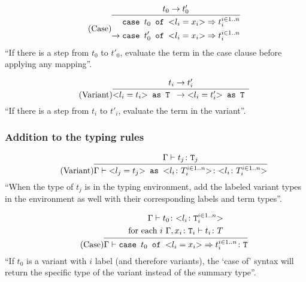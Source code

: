 \begin{equation*}
    \tag{Case}
    \infer{
        \begin{split}
            \texttt{case } t_0 \texttt{ of } \text{<}l_i=x_i\text{>} \Rightarrow t_i^{i \in 1..n} \\
            \rightarrow \texttt{case } t'_0 \texttt{ of } \text{<}l_i=x_i\text{>} \Rightarrow t_i^{i \in 1..n}
        \end{split}
    }{
        t_0 \rightarrow t'_0
    }
\end{equation*}
``If there is a step from $t_0$ to $t'_0$, evaluate the term
in the case clause before applying any mapping''.

\begin{equation*}
    \tag{Variant}
    \infer{
        \text{<}l_i=t_i\text{>} \texttt{ as T } \rightarrow \text{<}l_i=t'_i\text{>} \texttt{ as T }
    }{
        t_i \rightarrow t'_i
    }
\end{equation*}
``If there is a step from $t_i$ to $t'_i$, evaluate the term
in the variant''.

\subsubsection{Addition to the typing rules \cite{pierce2002ProgLang}}
\begin{equation*}
    \tag{Variant}
    \infer{
    \Gamma \vdash \text{<}l_j=t_j\text{>} \texttt{ as } \text{<}l_i \colon T_i^{i \in 1..n}\text{>} \colon \text{<}l_i \colon T_i^{i \in 1..n}\text{>}
    }{
    \Gamma \vdash t_j \colon \texttt{T}_j
    }
\end{equation*}
``When the type of $t_j$ is in the typing environment, add the labeled
variant types in the environment as well with their corresponding labels and
term types''.

\begin{equation*}
    \tag{Case}
    \infer{
    \Gamma \vdash \texttt{case } t_0 \texttt{ of } \text{<}l_i=x_i\text{>} \Rightarrow t_i^{i \in 1..n} \colon \texttt{T}
    }{
    \begin{split}
        \Gamma \vdash t_0 \colon \text{<}l_i \colon \texttt{T}_i^{i \in 1..n}\text{>} \\
        \text{for each } i \text{    } \Gamma, x_i \colon \texttt{T}_i \vdash t_i \colon T
    \end{split}
    }
\end{equation*}
``If $t_0$ is a variant with $i$ label (and therefore variants), the `case of' syntax
will return the specific type of the variant instead of the summary type''.

